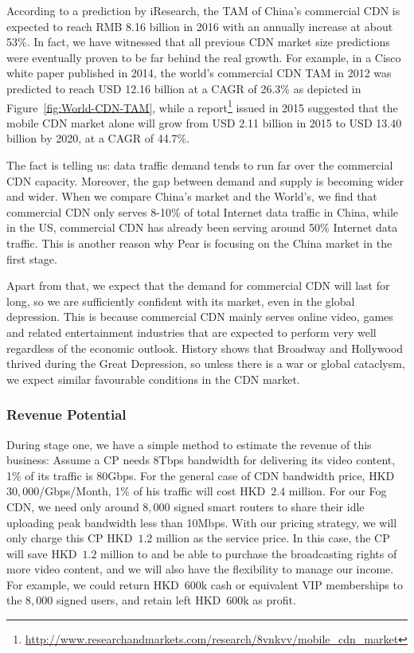 According to a prediction by iResearch, the TAM of China's commercial CDN is expected to reach RMB 8.16 billion in 2016 with an annually increase at about 53\%. 
In fact, we have witnessed that all previous CDN market size predictions were eventually proven to be far behind the real growth. For example, in a Cisco white paper published in 2014, the world's commercial CDN TAM in 2012 was predicted to reach USD 12.16 billion at a CAGR of 26.3\% as depicted in Figure~\ref{fig:World-CDN-TAM}, while a report\footnote{\url{http://www.researchandmarkets.com/research/8vnkvv/mobile_cdn_market}} issued in 2015 suggested that the mobile CDN market alone will grow from USD 2.11 billion in 2015 to USD 13.40 billion by 2020, at a CAGR of 44.7\%. 

The fact is telling us: data traffic demand tends to run far over the commercial CDN capacity. Moreover, the gap between demand and supply is becoming wider and wider. When we compare China's market and the World's, we find that commercial CDN only serves 8-10\% of total Internet data traffic in China, while in the US, commercial CDN has already been serving around 50\% Internet data traffic. This is another reason why Pear is focusing on the China market in the first stage.

Apart from that, we expect that the demand for commercial CDN will last for long, so we are sufficiently confident with its market, even in the global depression. This is because commercial CDN mainly serves online video, games and related entertainment industries that are expected to perform very well regardless of the economic outlook. History shows that Broadway and Hollywood thrived during the Great Depression, so unless there is a war or global cataclysm, we expect similar favourable conditions in the CDN market. 

\subsubsection{Revenue Potential}\label{revenue-potential}
During stage one, we have a simple method to estimate the revenue of this business:
Assume a CP needs 8Tbps bandwidth for delivering its video content, 1\% of its traffic is 80Gbps. For the general case of CDN bandwidth price, HKD~$30,000$/Gbps/Month, 1\% of his traffic will cost HKD~$2.4$ million. For our Fog CDN, we need only around $8,000$ signed smart routers to share their idle uploading peak bandwidth less than 10Mbps. With our pricing strategy, we will only charge this CP HKD~$1.2$ million as the service price. In this case, the CP will save HKD~$1.2$ million to and be able to purchase the broadcasting rights of more video content, and we will also have the flexibility to manage our income. For example, we could return HKD~$600$k cash or equivalent VIP memberships to the $8,000$ signed users, and retain left HKD~$600$k as profit.

